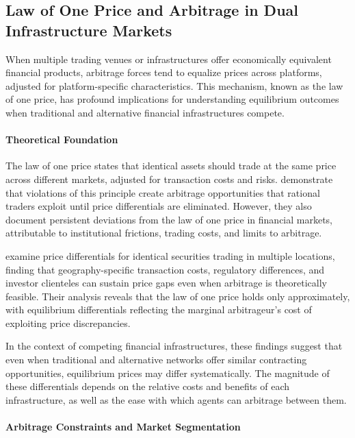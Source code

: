 \subsection{Law of One Price and Arbitrage in Dual Infrastructure Markets}

When multiple trading venues or infrastructures offer economically equivalent financial products, arbitrage forces tend to equalize prices across platforms, adjusted for platform-specific characteristics. This mechanism, known as the law of one price, has profound implications for understanding equilibrium outcomes when traditional and alternative financial infrastructures compete.

\paragraph{Theoretical Foundation}

The law of one price states that identical assets should trade at the same price across different markets, adjusted for transaction costs and risks.  demonstrate that violations of this principle create arbitrage opportunities that rational traders exploit until price differentials are eliminated. However, they also document persistent deviations from the law of one price in financial markets, attributable to institutional frictions, trading costs, and limits to arbitrage.

 examine price differentials for identical securities trading in multiple locations, finding that geography-specific transaction costs, regulatory differences, and investor clienteles can sustain price gaps even when arbitrage is theoretically feasible. Their analysis reveals that the law of one price holds only approximately, with equilibrium differentials reflecting the marginal arbitrageur's cost of exploiting price discrepancies.

In the context of competing financial infrastructures, these findings suggest that even when traditional and alternative networks offer similar contracting opportunities, equilibrium prices may differ systematically. The magnitude of these differentials depends on the relative costs and benefits of each infrastructure, as well as the ease with which agents can arbitrage between them.

\paragraph{Arbitrage Constraints and Market Segmentation}

